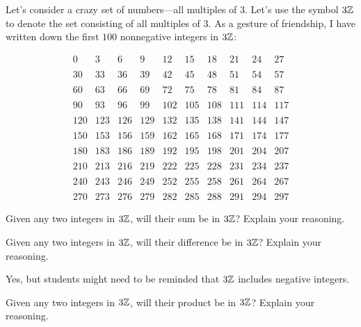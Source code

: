 \documentclass[nooutcomes]{ximera}
\begin{document}
Let's consider a crazy set of numbers---all multiples of $3$. Let's
use the symbol $3\mathbb Z$ to denote the set consisting of all multiples of
$3$. As a gesture of friendship, I have written down the first $100$
nonnegative integers in $3\mathbb Z$:

\[
\begin{array}{cccccccccc}
0   & 3   & 6   & 9   & 12  & 15  & 18  & 21  & 24  & 27  \\
\\
30  & 33  & 36  & 39  & 42  & 45  & 48  & 51  & 54  & 57  \\
\\
60  & 63  & 66  & 69  & 72  & 75  & 78  & 81  & 84  & 87  \\
\\
90  & 93  & 96  & 99  & 102 & 105 & 108 & 111 & 114 & 117 \\
\\
120 & 123 & 126 & 129 & 132 & 135 & 138 & 141 & 144 & 147 \\
\\
150 & 153 & 156 & 159 & 162 & 165 & 168 & 171 & 174 & 177 \\
\\
180 & 183 & 186 & 189 & 192 & 195 & 198 & 201 & 204 & 207 \\
\\
210 & 213 & 216 & 219 & 222 & 225 & 228 & 231 & 234 & 237 \\
\\
240 & 243 & 246 & 249 & 252 & 255 & 258 & 261 & 264 & 267 \\
\\
270 & 273 & 276 & 279 & 282 & 285 & 288 & 291 & 294 & 297
\end{array}
\]



\begin{problem}
Given any two integers in $3\mathbb Z$, will their sum be in $3\mathbb Z$? Explain
your reasoning.
\end{problem}

\begin{problem}
Given any two integers in $3\mathbb Z$, will their difference be in $3\mathbb Z$?
Explain your reasoning.
\end{problem}
\begin{teachingnote}
Yes, but students might need to be reminded that $3\mathbb Z$ includes negative integers.  
\end{teachingnote}

\begin{problem}
Given any two integers in $3\mathbb Z$, will their product be in $3\mathbb Z$?
Explain your reasoning.
\end{problem}
\end{document}
